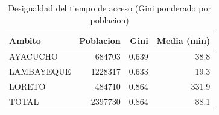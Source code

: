\begin{table}[htbp]
\caption{Desigualdad del tiempo de acceso (Gini ponderado por poblacion)}
\label{tab:gini}
\begin{tabular}{lrrr}
\toprule
Ambito & Poblacion & Gini & Media (min) \\
\midrule
AYACUCHO & 684703 & 0.639 & 38.8 \\
LAMBAYEQUE & 1228317 & 0.633 & 19.3 \\
LORETO & 484710 & 0.864 & 331.9 \\
TOTAL & 2397730 & 0.864 & 88.1 \\
\bottomrule
\end{tabular}
\end{table}
